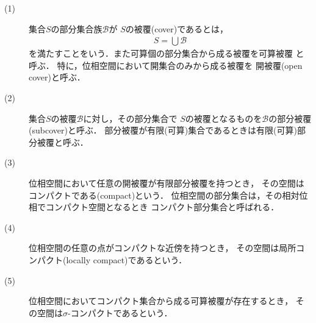 	\begin{screen}
		\begin{dfn}\mbox{}
			\begin{description}
				\item[(1)]
					集合$S$の部分集合族$\mathscr{B}$が
					$S$の被覆(cover)であるとは，
					\begin{align}
						S = \bigcup \mathscr{B}
					\end{align}
					を満たすことをいう．また可算個の部分集合から成る被覆を可算被覆
					と呼ぶ．
					特に，位相空間において開集合のみから成る被覆を
					開被覆(open cover)と呼ぶ．
				
				\item[(2)] 集合$S$の被覆$\mathscr{B}$に対し，その部分集合で
					$S$の被覆となるものを$\mathscr{B}$の部分被覆
					(subcover)と呼ぶ．
					部分被覆が有限(可算)集合であるときは有限(可算)部分被覆と呼ぶ．
					
				\item[(3)] 
					位相空間において任意の開被覆が有限部分被覆を持つとき，
					その空間はコンパクトである(compact)という．
					位相空間の部分集合は，その相対位相でコンパクト空間となるとき
					コンパクト部分集合と呼ばれる．
				
				\item[(4)] 位相空間の任意の点がコンパクトな近傍を持つとき，
					その空間は局所コンパクト(locally compact)であるという．
					
				\item[(5)] 位相空間においてコンパクト集合から成る可算被覆が存在するとき，
					その空間は$\sigma$-コンパクトであるという．
			\end{description}
		\end{dfn}
	\end{screen}
	
	\begin{screen}
		\begin{thm}[コンパクト部分集合]
		\end{thm}
	\end{screen}
	
